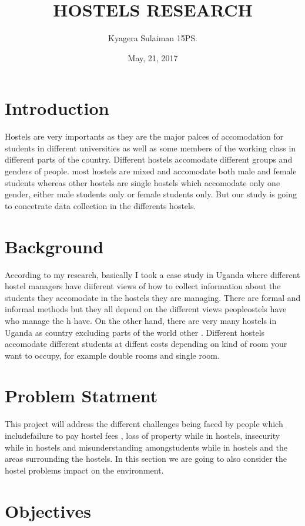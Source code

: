 \documentclass[12pt]{article}
\begin{document}
\title{HOSTELS RESEARCH }
\author{Kyagera Sulaiman 15\u{}\ps}
\date{May, 21, 2017}
\maketitle

\section{Introduction}
Hostels are very importants as they are the major palces of accomodation for students in different universities as well as some members of the working class in different parts of the country. Different hostels accomodate different groups and genders of people. most hostels are  mixed and accomodate both male and female students whereas other hostels are single hostels which accomodate only one gender, either male students only or female students only. But our study is going to concetrate data collection in the differents hostels.


\section{Background}
According to my research, basically I took a case study in Uganda where different hostel managers have diiferent views of how to collect information about the students they accomodate in the hostels they are managing. There are formal and informal methods but they all depend on the different views peopleostels have who manage the h have.
On the other hand, there are very many hostels in Uganda as country excluding parts of the world other .  Different hostels accomodate different students at diffent costs depending on kind of room your want to occupy, for  example double rooms and single room.

\section{Problem Statment}
This project will address the different challenges being faced by people which includefailure to pay hostel fees , loss of property while in hostels, insecurity while in hostels and misunderstanding amongstudents while in hostels and the areas surrounding the hostels.
In this section we are going to also consider the hostel problems impact on the environment.

\section{Objectives}
\end{document}
